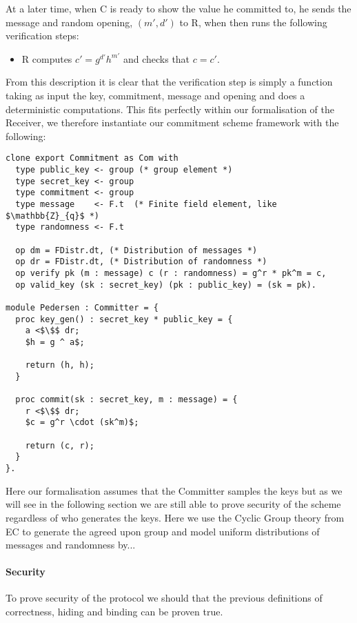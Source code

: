 At a later time, when C is ready to show the value he committed to, he sends the
message and random opening, $(m',d')$ to R, when then runs the following
verification steps:
\begin{itemize}
  \item R computes $c' = g^{d'}h^{m'}$ and checks that $c = c'$.
\end{itemize}

From this description it is clear that the verification step is simply a
function taking as input the key, commitment, message and opening and does a
deterministic computations. This fits perfectly within our formalisation of the
Receiver, we therefore instantiate our commitment scheme framework with the
following:

\begin{lstlisting}[mathescape,label=lst:commitment:pedersen,caption=Pedersen instantiation]
clone export Commitment as Com with
  type public_key <- group (* group element *)
  type secret_key <- group
  type commitment <- group
  type message    <- F.t  (* Finite field element, like $\mathbb{Z}_{q}$ *)
  type randomness <- F.t

  op dm = FDistr.dt, (* Distribution of messages *)
  op dr = FDistr.dt, (* Distribution of randomness *)
  op verify pk (m : message) c (r : randomness) = g^r * pk^m = c,
  op valid_key (sk : secret_key) (pk : public_key) = (sk = pk).

module Pedersen : Committer = {
  proc key_gen() : secret_key * public_key = {
    a <$\$$ dr;
    $h = g ^ a$;

    return (h, h);
  }

  proc commit(sk : secret_key, m : message) = {
    r <$\$$ dr;
    $c = g^r \cdot (sk^m)$;

    return (c, r);
  }
}.

\end{lstlisting}

Here our formalisation assumes that the Committer samples the keys but as we
will see in the following section we are still able to prove security of the
scheme regardless of who generates the keys.
Here we use the Cyclic Group theory from EC to generate the agreed upon group
and model uniform distributions of messages and randomness by...

\paragraph{Security}
To prove security of the protocol we should that the previous definitions of
correctness, hiding and binding can be proven true.

